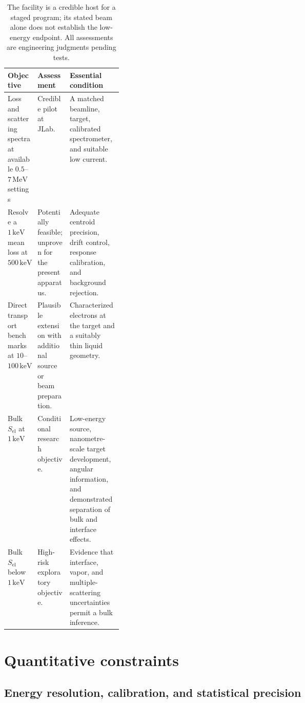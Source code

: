 \documentclass[11pt,letterpaper]{article}
\newcommand{\keV}{\,\mathrm{keV}}
\newcommand{\MeV}{\,\mathrm{MeV}}
\begin{document}
\begin{table}[htbp]
\small
\begin{tabularx}{\linewidth}{@{}p{0.26\linewidth}YY@{}}
\toprule
Objective & Assessment & Essential condition \\
\midrule
Loss and scattering spectra at available $0.5$--$7\MeV$ settings
& Credible pilot at JLab.
& A matched beamline, target, calibrated spectrometer, and suitable low current. \\
\addlinespace
Resolve a $1\keV$ mean loss at $500\keV$
& Potentially feasible; unproven for the present apparatus.
& Adequate centroid precision, drift control, response calibration, and background rejection. \\
\addlinespace
Direct transport benchmarks at $10$--$100\keV$
& Plausible extension with additional source or beam preparation.
& Characterized electrons at the target and a suitably thin liquid geometry. \\
\addlinespace
Bulk $S_{\mathrm{el}}$ at $1\keV$
& Conditional research objective.
& Low-energy source, nanometre-scale target development, angular information, and demonstrated
separation of bulk and interface effects. \\
\addlinespace
Bulk $S_{\mathrm{el}}$ below $1\keV$
& High-risk exploratory objective.
& Evidence that interface, vapor, and multiple-scattering uncertainties permit a bulk inference. \\
\bottomrule
\end{tabularx}
\caption{The facility is a credible host for a staged program; its stated beam alone does not
establish the low-energy endpoint. All assessments are engineering judgments pending tests.}
\end{table}

\section{Quantitative constraints}

\subsection{Energy resolution, calibration, and statistical precision}
\end{document}
